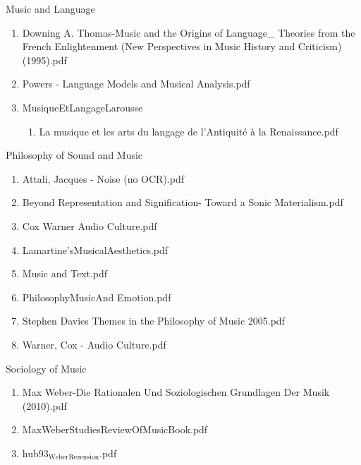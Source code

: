 \documentclass[11pt]{article}
\begin{document}
\item Music and Language
\label{sec-1-1-1-1-31-13}
\begin{enumerate}
\item Downing A. Thomas-Music and the Origins of Language\_ Theories from the French Enlightenment (New Perspectives in Music History and Criticism) (1995).pdf
\label{sec-1-1-1-1-31-13-1}

\item Powers - Language Models and Musical Analysis.pdf
\label{sec-1-1-1-1-31-13-2}

\item MusiqueEtLangageLarousse
\label{sec-1-1-1-1-31-13-3}
\begin{enumerate}
\item La musique et les arts du langage de l'Antiquité à la Renaissance.pdf
\label{sec-1-1-1-1-31-13-3-1}
\end{enumerate}
\end{enumerate}

\item Philosophy of Sound and Music
\label{sec-1-1-1-1-31-14}
\begin{enumerate}
\item Attali, Jacques - Noise (no OCR).pdf
\label{sec-1-1-1-1-31-14-1}

\item Beyond Representation and Signification- Toward a   Sonic Materialism.pdf
\label{sec-1-1-1-1-31-14-2}

\item Cox Warner Audio Culture.pdf
\label{sec-1-1-1-1-31-14-3}

\item Lamartine'sMusicalAesthetics.pdf
\label{sec-1-1-1-1-31-14-4}

\item Music and Text.pdf
\label{sec-1-1-1-1-31-14-5}

\item PhilosophyMusicAnd Emotion.pdf
\label{sec-1-1-1-1-31-14-6}

\item Stephen Davies Themes in the Philosophy of Music  2005.pdf
\label{sec-1-1-1-1-31-14-7}

\item Warner, Cox - Audio Culture.pdf
\label{sec-1-1-1-1-31-14-8}
\end{enumerate}

\item Sociology of Music
\label{sec-1-1-1-1-31-15}
\begin{enumerate}
\item Max Weber-Die Rationalen Und Soziologischen Grundlagen Der Musik (2010).pdf
\label{sec-1-1-1-1-31-15-1}

\item MaxWeberStudiesReviewOfMusicBook.pdf
\label{sec-1-1-1-1-31-15-2}

\item hub93$_{\text{Weber}}$$_{\text{Rezension}}$.pdf
\label{sec-1-1-1-1-31-15-3}
\end{enumerate}
\end{document}
